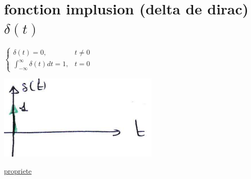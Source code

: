 \documentclass[12pt]{book}
\begin{document}
        \section{fonction implusion (delta de dirac) $\delta(t)$}
            \begin{center}
                \begin{minipage}{0.49\linewidth}
                    $  
                    \begin{cases}
                        \delta(t) =0 , & t \not = 0 \\
                        \int^\infty_{-\infty}\delta(t)dt =1, & t =0
                    \end{cases}
                    $
                \end{minipage}
                \begin{minipage}{0.39\linewidth}
                    \includegraphics[width = \linewidth]{pic/deltadirac.png}
                \end{minipage}
            \end{center}
            \underline{propriete}
\end{document}
